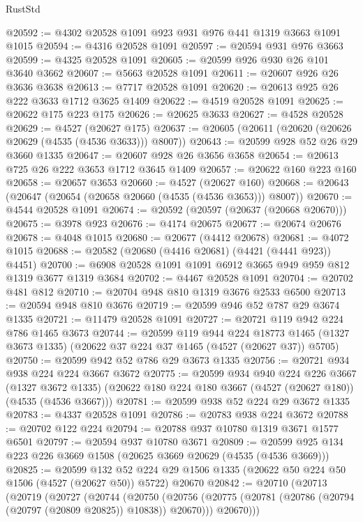 \begin{lexlean}{RustStd}
\begin{coremodule}
@20592 := @4302 @20528 @1091 @923 @931 @976 @441 @1319 @3663 @1091 @1015
@20594 := @4316 @20528 @1091
@20597 := @20594 @931 @976 @3663
@20599 := @4325 @20528 @1091
@20605 := @20599 @926 @930 @26 @101 @3640 @3662
@20607 := @5663 @20528 @1091
@20611 := @20607 @926 @26 @3636 @3638
@20613 := @7717 @20528 @1091
@20620 := @20613 @925 @26 @222 @3633 @1712 @3625 @1409
@20622 := @4519 @20528 @1091
@20625 := @20622 @175 @223 @175
@20626 := @20625 @3633
@20627 := @4528 @20528
@20629 := @4527 (@20627 @175)
@20637 := @20605 (@20611 (@20620 (@20626 @20629 (@4535 (@4536 @3633))) @8007))
@20643 := @20599 @928 @52 @26 @29 @3660 @1335
@20647 := @20607 @928 @26 @3656 @3658
@20654 := @20613 @725 @26 @222 @3653 @1712 @3645 @1409
@20657 := @20622 @160 @223 @160
@20658 := @20657 @3653
@20660 := @4527 (@20627 @160)
@20668 := @20643 (@20647 (@20654 (@20658 @20660 (@4535 (@4536 @3653))) @8007))
@20670 := @4544 @20528 @1091
@20674 := @20592 (@20597 (@20637 (@20668 @20670)))
@20675 := @3978 @923
@20676 := @4174 @20675
@20677 := @20674 @20676
@20678 := @4048 @1015
@20680 := @20677 (@4412 @20678)
@20681 := @4072 @1015
@20688 := @20582 (@20680 (@4416 @20681) (@4421 (@4441 @923)) @4451)
@20700 := @6908 @20528 @1091 @1091 @6912 @3665 @949 @959 @812 @1319 @3677 @1319 @3684
@20702 := @4467 @20528 @1091
@20704 := @20702 @481 @812
@20710 := @20704 @948 @810 @1319 @3676 @2533 @6500
@20713 := @20594 @948 @810 @3676
@20719 := @20599 @946 @52 @787 @29 @3674 @1335
@20721 := @11479 @20528 @1091
@20727 := @20721 @119 @942 @224 @786 @1465 @3673
@20744 := @20599
    @119
    @944
    @224
    @18773
    @1465
    (@1327 @3673 @1335)
    (@20622 @37 @224 @37 @1465 (@4527 (@20627 @37)) @5705)
@20750 := @20599 @942 @52 @786 @29 @3673 @1335
@20756 := @20721 @934 @938 @224 @224 @3667 @3672
@20775 := @20599
    @934
    @940
    @224
    @226
    @3667
    (@1327 @3672 @1335)
    (@20622 @180 @224 @180 @3667 (@4527 (@20627 @180)) (@4535 (@4536 @3667)))
@20781 := @20599 @938 @52 @224 @29 @3672 @1335
@20783 := @4337 @20528 @1091
@20786 := @20783 @938 @224 @3672
@20788 := @20702 @122 @224
@20794 := @20788 @937 @10780 @1319 @3671 @1577 @6501
@20797 := @20594 @937 @10780 @3671
@20809 := @20599 @925 @134 @223 @226 @3669 @1508 (@20625 @3669 @20629 (@4535 (@4536 @3669)))
@20825 := @20599
    @132
    @52
    @224
    @29
    @1506
    @1335
    (@20622 @50 @224 @50 @1506 (@4527 (@20627 @50)) @5722)
    @20670
@20842 := @20710
    (@20713
      (@20719
        (@20727
          (@20744
            (@20750
              (@20756 (@20775 (@20781 (@20786 (@20794 (@20797 (@20809 @20825)) @10838)) @20670)))
              @20670)))

\end{coremodule}
\end{lexlean}
